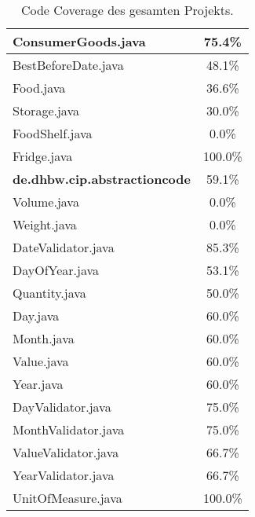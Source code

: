 \begin{table}[ht]
\begin{tabular}{|l|c|}
        \hline
        ConsumerGoods.java & 75.4\% \\
        \hline
        BestBeforeDate.java & 48.1\% \\
        \hline
        Food.java & 36.6\% \\
        \hline
        Storage.java & 30.0\% \\
        \hline
        FoodShelf.java & 0.0\% \\
        \hline
        Fridge.java & 100.0\% \\
        \hline
        \textbf{de.dhbw.cip.abstractioncode} & 59.1\% \\
        \hline
        Volume.java & 0.0\% \\
        \hline
        Weight.java & 0.0\% \\
        \hline
        DateValidator.java & 85.3\% \\
        \hline
        DayOfYear.java & 53.1\% \\
        \hline
        Quantity.java & 50.0\% \\
        \hline
        Day.java & 60.0\% \\
        \hline
        Month.java & 60.0\% \\
        \hline
        Value.java & 60.0\% \\
        \hline
        Year.java & 60.0\% \\
        \hline
        DayValidator.java & 75.0\% \\
        \hline
        MonthValidator.java & 75.0\% \\
        \hline
        ValueValidator.java & 66.7\% \\
        \hline
        YearValidator.java & 66.7\% \\
        \hline
        UnitOfMeasure.java & 100.0\% \\
        \hline
    \end{tabular}
    \caption{Code Coverage des gesamten Projekts.}
    \label{tab:code-coverage-full}
\end{table}
